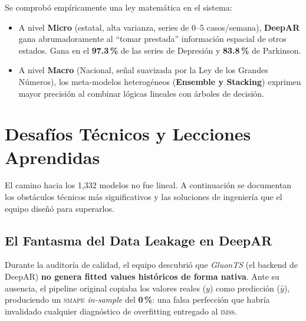 \documentclass[12pt, letterpaper]{article}
\newcommand{\smape}{\textsc{smape}}
\newcommand{\imss}{\textsc{imss}}
\begin{document}
\begin{insightbox}
Se comprobó empíricamente una ley matemática en el sistema:
\begin{itemize}[noitemsep]
    \item A nivel \textbf{Micro} (estatal, alta varianza, series de 0--5 casos/semana), \textbf{DeepAR} gana abrumadoramente al ``tomar prestada'' información espacial de otros estados. Gana en el \textbf{97.3\,\%} de las series de Depresión y \textbf{83.8\,\%} de Parkinson.
    \item A nivel \textbf{Macro} (Nacional, señal suavizada por la Ley de los Grandes Números), los meta-modelos heterogéneos (\textbf{Ensemble y Stacking}) exprimen mayor precisión al combinar lógicas lineales con árboles de decisión.
\end{itemize}
\end{insightbox}

\newpage

\section{Desafíos Técnicos y Lecciones Aprendidas}\label{sec:desafios}

El camino hacia los 1,332 modelos no fue lineal. A continuación se documentan los obstáculos técnicos más significativos y las soluciones de ingeniería que el equipo diseñó para superarlos.

\subsection{El Fantasma del Data Leakage en DeepAR}\label{subsec:leakage}

\begin{criticalbox}
Durante la auditoría de calidad, el equipo descubrió que \textit{GluonTS} (el backend de DeepAR) \textbf{no genera fitted values históricos de forma nativa}. Ante su ausencia, el pipeline original copiaba los valores reales ($y$) como predicción ($\hat{y}$), produciendo un \smape{} \textit{in-sample} del \textbf{0\,\%}: una falsa perfección que habría invalidado cualquier diagnóstico de overfitting entregado al \imss{}.
\end{criticalbox}
\end{document}
